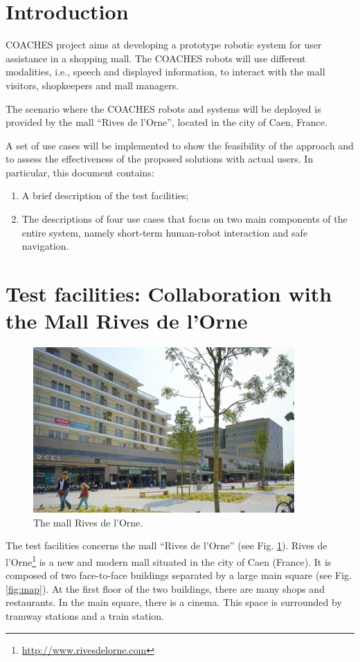 \section{Introduction}

COACHES project aims at developing a prototype robotic system for user assistance in a shopping mall.
The COACHES robots will use different modalities, i.e., speech and displayed information,
to interact with the mall visitors, shopkeepers and mall managers.

The scenario where the COACHES robots and systems will be deployed is provided
by the mall ``Rives de l'Orne'', located in the city of Caen, France.

A set of use cases will be implemented to show the feasibility of the approach and to assess the effectiveness of the proposed solutions with actual users.
In particular, this document contains:
\begin{enumerate}
\item A brief description of the test facilities;
\item The descriptions of four use cases that focus on two main components of the entire system,
namely short-term human-robot interaction and safe navigation.
\end{enumerate}

\section{Test facilities: Collaboration with the Mall Rives de l'Orne}

\begin{figure}[!t]
\begin{center}
\includegraphics[width=0.55\linewidth]{outsiderivesdelorne}
\caption{The mall Rives de l'Orne.}
\label{fig:outsidemall}
\end{center}
\end{figure}

The test facilities concerns the mall ``Rives de l'Orne'' (see Fig. \ref{fig:outsidemall}). Rives de l'Orne\footnote{\url{http://www.rivesdelorne.com}} is a 
new and modern mall
situated in the city of Caen (France). It is composed of two face-to-face buildings separated by a large
main square (see Fig. \ref{fig:map}). At the first floor of the two buildings, there are many shops and restaurants. In the main square, there is a cinema. This space is surrounded by tramway stations and a train station.

